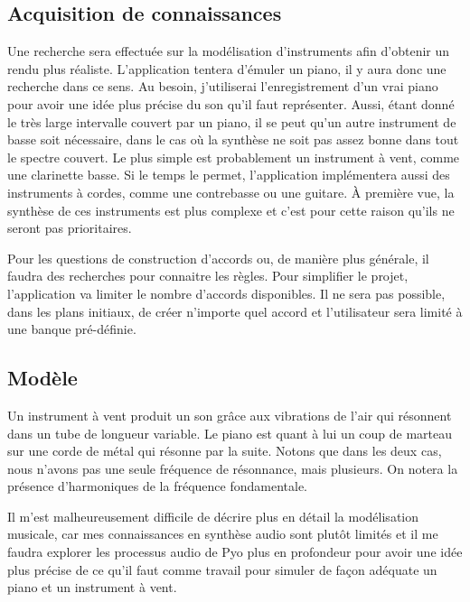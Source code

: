 \documentclass[letterpaper,12pt]{scrartcl}
\begin{document}
	\subsection{Acquisition de connaissances}
	Une recherche sera effectuée sur la modélisation d'instruments afin d'obtenir un rendu plus réaliste. L'application tentera d'émuler un piano, il y aura donc une recherche dans ce sens. Au besoin, j'utiliserai l'enregistrement d'un vrai piano pour avoir une idée plus précise du son qu'il faut représenter. Aussi, étant donné le très large intervalle couvert par un piano, il se peut qu'un autre instrument de basse soit nécessaire, dans le cas où la synthèse ne soit pas assez bonne dans tout le spectre couvert. Le plus simple est probablement un instrument à vent, comme une clarinette basse. Si le temps le permet, l'application implémentera aussi des instruments à cordes, comme une contrebasse ou une guitare. À première vue, la synthèse de ces instruments est plus complexe et c'est pour cette raison qu'ils ne seront pas prioritaires.
	
	Pour les questions de construction d'accords ou, de manière plus générale, il faudra des recherches pour connaitre les règles. Pour simplifier le projet, l'application va limiter le nombre d'accords disponibles. Il ne sera pas possible, dans les plans initiaux, de créer n'importe quel accord et l'utilisateur sera limité à une banque pré-définie.
	
	\subsection{Modèle}
	Un instrument à vent produit un son grâce aux vibrations de l'air qui résonnent dans un tube de longueur variable. Le piano est quant à lui un coup de marteau sur une corde de métal qui résonne par la suite. Notons que dans les deux cas, nous n'avons pas une seule fréquence de résonnance, mais plusieurs. On notera la présence d'harmoniques de la fréquence fondamentale.
	
	Il m'est malheureusement difficile de décrire plus en détail la modélisation musicale, car mes connaissances en synthèse audio sont plutôt limités et il me faudra explorer les processus audio de Pyo plus en profondeur pour avoir une idée plus précise de ce qu'il faut comme travail pour simuler de façon adéquate un piano et un instrument à vent.
\end{document}
